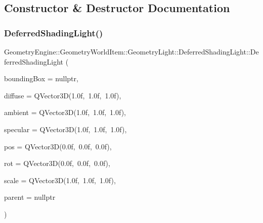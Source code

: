 \subsection{Constructor \& Destructor Documentation}
\mbox{\label{class_geometry_engine_1_1_geometry_world_item_1_1_geometry_light_1_1_deferred_shading_light_ac5d6155ce4539820a6e93a733a67fb3f}} 
\subsubsection{\texorpdfstring{DeferredShadingLight()}{DeferredShadingLight()}\hspace{0.1cm}{\footnotesize\ttfamily [1/2]}}
{\footnotesize\ttfamily Geometry\+Engine\+::\+Geometry\+World\+Item\+::\+Geometry\+Light\+::\+Deferred\+Shading\+Light\+::\+Deferred\+Shading\+Light (\begin{DoxyParamCaption}\item[{\mbox{\hyperlink{class_geometry_engine_1_1_geometry_world_item_1_1_geometry_item_1_1_geometry_item}{Geometry\+Item\+::\+Geometry\+Item}} $\ast$}]{bounding\+Box = {\ttfamily nullptr},  }\item[{const Q\+Vector3D \&}]{diffuse = {\ttfamily QVector3D(1.0f,~1.0f,~1.0f)},  }\item[{const Q\+Vector3D \&}]{ambient = {\ttfamily QVector3D(1.0f,~1.0f,~1.0f)},  }\item[{const Q\+Vector3D \&}]{specular = {\ttfamily QVector3D(1.0f,~1.0f,~1.0f)},  }\item[{const Q\+Vector3D \&}]{pos = {\ttfamily QVector3D(0.0f,~0.0f,~0.0f)},  }\item[{const Q\+Vector3D \&}]{rot = {\ttfamily QVector3D(0.0f,~0.0f,~0.0f)},  }\item[{const Q\+Vector3D \&}]{scale = {\ttfamily QVector3D(1.0f,~1.0f,~1.0f)},  }\item[{\mbox{\hyperlink{class_geometry_engine_1_1_geometry_world_item_1_1_world_item}{World\+Item}} $\ast$}]{parent = {\ttfamily nullptr} }\end{DoxyParamCaption})}

